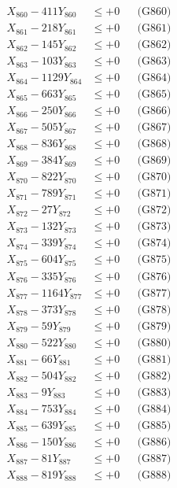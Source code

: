 \documentclass[a4paper,10pt]{article}
\begin{document}
{\begin{align}
X_{860} - 411Y_{860} &\leq +0 && \text{(G860)} \\
\allowbreak
X_{861} - 218Y_{861} &\leq +0 && \text{(G861)} \\
X_{862} - 145Y_{862} &\leq +0 && \text{(G862)} \\
X_{863} - 103Y_{863} &\leq +0 && \text{(G863)} \\
X_{864} - 1129Y_{864} &\leq +0 && \text{(G864)} \\
X_{865} - 663Y_{865} &\leq +0 && \text{(G865)} \\
X_{866} - 250Y_{866} &\leq +0 && \text{(G866)} \\
X_{867} - 505Y_{867} &\leq +0 && \text{(G867)} \\
X_{868} - 836Y_{868} &\leq +0 && \text{(G868)} \\
X_{869} - 384Y_{869} &\leq +0 && \text{(G869)} \\
X_{870} - 822Y_{870} &\leq +0 && \text{(G870)} \\
\allowbreak
X_{871} - 789Y_{871} &\leq +0 && \text{(G871)} \\
X_{872} - 27Y_{872} &\leq +0 && \text{(G872)} \\
X_{873} - 132Y_{873} &\leq +0 && \text{(G873)} \\
X_{874} - 339Y_{874} &\leq +0 && \text{(G874)} \\
X_{875} - 604Y_{875} &\leq +0 && \text{(G875)} \\
X_{876} - 335Y_{876} &\leq +0 && \text{(G876)} \\
X_{877} - 1164Y_{877} &\leq +0 && \text{(G877)} \\
X_{878} - 373Y_{878} &\leq +0 && \text{(G878)} \\
X_{879} - 59Y_{879} &\leq +0 && \text{(G879)} \\
X_{880} - 522Y_{880} &\leq +0 && \text{(G880)} \\
\allowbreak
X_{881} - 66Y_{881} &\leq +0 && \text{(G881)} \\
X_{882} - 504Y_{882} &\leq +0 && \text{(G882)} \\
X_{883} - 9Y_{883} &\leq +0 && \text{(G883)} \\
X_{884} - 753Y_{884} &\leq +0 && \text{(G884)} \\
X_{885} - 639Y_{885} &\leq +0 && \text{(G885)} \\
X_{886} - 150Y_{886} &\leq +0 && \text{(G886)} \\
X_{887} - 81Y_{887} &\leq +0 && \text{(G887)} \\
X_{888} - 819Y_{888} &\leq +0 && \text{(G888)} \\

\end{align}}
\end{document}
